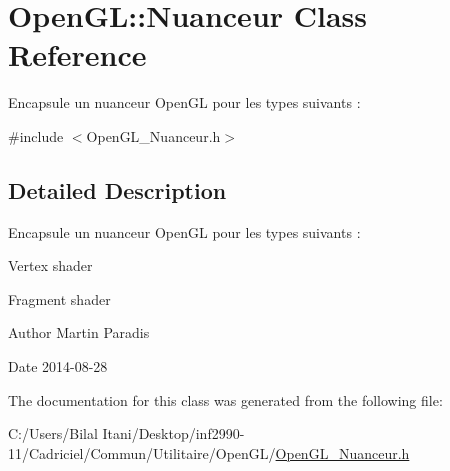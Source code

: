 \hypertarget{class_open_g_l_1_1_nuanceur}{}\section{Open\+GL\+:\+:Nuanceur Class Reference}
\label{class_open_g_l_1_1_nuanceur}


Encapsule un nuanceur Open\+GL pour les types suivants \+:  




{\ttfamily \#include $<$Open\+G\+L\+\_\+\+Nuanceur.\+h$>$}



\subsection{Detailed Description}
Encapsule un nuanceur Open\+GL pour les types suivants \+: 


\begin{DoxyItemize}
\item Vertex shader
\item Fragment shader
\end{DoxyItemize}

\begin{DoxyAuthor}{Author}
Martin Paradis 
\end{DoxyAuthor}
\begin{DoxyDate}{Date}
2014-\/08-\/28 
\end{DoxyDate}


The documentation for this class was generated from the following file\+:\begin{DoxyCompactItemize}
\item 
C\+:/\+Users/\+Bilal Itani/\+Desktop/inf2990-\/11/\+Cadriciel/\+Commun/\+Utilitaire/\+Open\+G\+L/\hyperlink{_open_g_l___nuanceur_8h}{Open\+G\+L\+\_\+\+Nuanceur.\+h}\end{DoxyCompactItemize}
